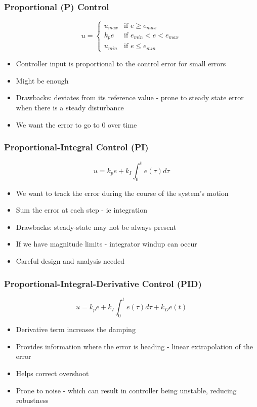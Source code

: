 \documentclass{beamer}
\begin{document}
\begin{frame}
\frametitle{Proportional (P) Control}
\begin{equation}
u = 
\begin{cases}
    u_{max} & \text{if } e \geq e_{max}\\
    k_p e & \text{if } e_{min} < e < e_{max} \\
    u_{min} & \text{if } e \leq e_{min} 
\end{cases}
\end{equation}
\begin{itemize}
    \item Controller input is proportional to the control error for small errors
    \item Might be enough
    \item Drawbacks: deviates from its reference value - prone to steady state error when there is a steady disturbance
    \item We want the error to go to 0 over time
\end{itemize}
\end{frame}

\begin{frame}
\frametitle{Proportional-Integral Control (PI)}
\begin{equation}
u = k_p e + k_I \int_{0}^{t} e(\tau) d\tau
\end{equation}
\begin{itemize}
    \item We want to track the error during the course of the system's motion
    \item Sum the error at each step - ie integration
    \item Drawbacks: steady-state may not be always present
    \item If we have magnitude limits - integrator windup can occur
    \item Careful design and analysis needed
\end{itemize}
\end{frame}

\begin{frame}
\frametitle{Proportional-Integral-Derivative Control (PID)}
\begin{equation}
u = k_p e + k_I \int_{0}^{t} e(\tau) d\tau + k_D \dot{e}(t)
\end{equation}
\begin{itemize}
    \item Derivative term increases the damping
    \item Provides information where the error is heading - linear extrapolation of the error
    \item Helps correct overshoot
    \item Prone to noise - which can result in controller being unstable, reducing robustness
\end{itemize}
\end{frame}
\end{document}
